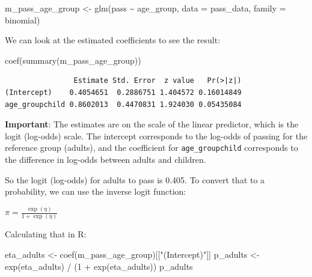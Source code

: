 \documentclass[
  letterpaper,
  8pt,
  a4paper]{book}
\newenvironment{Shaded}{\begin{snugshade}}{\end{snugshade}}
\newcommand{\AttributeTok}[1]{\textcolor[rgb]{0.40,0.45,0.13}{#1}}
\newcommand{\DecValTok}[1]{\textcolor[rgb]{0.68,0.00,0.00}{#1}}
\newcommand{\FunctionTok}[1]{\textcolor[rgb]{0.28,0.35,0.67}{#1}}
\newcommand{\NormalTok}[1]{\textcolor[rgb]{0.00,0.23,0.31}{#1}}
\newcommand{\OtherTok}[1]{\textcolor[rgb]{0.00,0.23,0.31}{#1}}
\newcommand{\SpecialCharTok}[1]{\textcolor[rgb]{0.37,0.37,0.37}{#1}}
\newcommand{\StringTok}[1]{\textcolor[rgb]{0.13,0.47,0.30}{#1}}
\begin{document}
\begin{Shaded}
\begin{Highlighting}[]
\NormalTok{m\_pass\_age\_group }\OtherTok{\textless{}{-}} \FunctionTok{glm}\NormalTok{(pass }\SpecialCharTok{\textasciitilde{}}\NormalTok{ age\_group, }\AttributeTok{data =}\NormalTok{ pass\_data, }\AttributeTok{family =}\NormalTok{ binomial)}
\end{Highlighting}
\end{Shaded}

We can look at the estimated coefficients to see the result:

\begin{Shaded}
\begin{Highlighting}[]
\FunctionTok{coef}\NormalTok{(}\FunctionTok{summary}\NormalTok{(m\_pass\_age\_group))}
\end{Highlighting}
\end{Shaded}

\begin{verbatim}
                Estimate Std. Error  z value   Pr(>|z|)
(Intercept)    0.4054651  0.2886751 1.404572 0.16014849
age_groupchild 0.8602013  0.4470831 1.924030 0.05435084
\end{verbatim}

\textbf{Important}: The estimates are on the scale of the linear
predictor, which is the logit (log-odds) scale. The intercept
corresponds to the log-odds of passing for the reference group (adults),
and the coefficient for \texttt{age\_groupchild} corresponds to the
difference in log-odds between adults and children.

So the logit (log-odds) for adults to pass is 0.405. To convert that to
a probability, we can use the inverse logit function:

\(\pi = \frac{\exp(\eta)}{1+\exp(\eta)}\)

Calculating that in R:

\begin{Shaded}
\begin{Highlighting}[]
\NormalTok{eta\_adults }\OtherTok{\textless{}{-}} \FunctionTok{coef}\NormalTok{(m\_pass\_age\_group)[[}\StringTok{"(Intercept)"}\NormalTok{]]}
\NormalTok{p\_adults }\OtherTok{\textless{}{-}} \FunctionTok{exp}\NormalTok{(eta\_adults) }\SpecialCharTok{/}\NormalTok{ (}\DecValTok{1} \SpecialCharTok{+} \FunctionTok{exp}\NormalTok{(eta\_adults))}
\NormalTok{p\_adults}
\end{Highlighting}
\end{Shaded}
\end{document}
